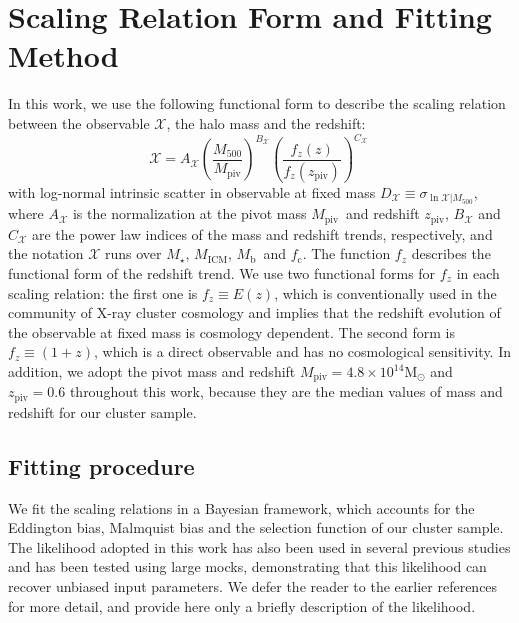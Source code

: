 \documentclass[useAMS,usenatbib,iop,numberedappendix]{mn2e}
\newcommand{\Msun}{\ensuremath{\mathrm{M}_{\odot}}}
\newcommand{\Mfiveoo}{\ensuremath{M_{500}}}
\newcommand{\redshift}{\ensuremath{z}}
\newcommand{\Mstar}{\ensuremath{M_{\star}}}
\newcommand{\Mgas}{\ensuremath{M_{\mathrm{ICM}}}}
\newcommand{\Mbary}{\ensuremath{M_{\mathrm{b}}}}
\newcommand{\MPIV}{\ensuremath{M_{\mathrm{piv}}}}
\newcommand{\ZPIV}{\ensuremath{z_{\mathrm{piv}}}}
\newcommand{\fcold}{\ensuremath{f_{\mathrm{c}}}}
\begin{document}
%
%



\section{Scaling Relation Form and Fitting Method}
\label{sec:method}

In this work, we use the following functional form to describe the scaling relation between the observable $\mathcal{X}$, the halo mass and the redshift:
%
\begin{equation}
\label{eq:sr_functional_form}
\mathcal{X} = A_{\mathcal{X}}
\left( \frac{\Mfiveoo}{\MPIV} \right)^{B_{\mathcal{X}}}
\left( \frac{f_{\redshift}(\redshift)}{f_{\redshift}(\ZPIV)} \right)^{C_{\mathcal{X}}} \, 
\end{equation}
%
with log-normal intrinsic scatter in observable at fixed mass $D_{\mathcal{X}} \equiv \sigma_{\ln \mathcal{X}|M_{500}}$, where $A_{\mathcal{X}}$ is the normalization at the pivot mass \MPIV\ and redshift \ZPIV, $B_{\mathcal{X}}$ and $C_{\mathcal{X}}$ are the power law indices of the mass and redshift trends, respectively, and the notation $\mathcal{X}$ runs over \Mstar, \Mgas, \Mbary\ and \fcold.
The function $f_{\redshift}$ describes the functional form of the redshift trend. 
We use two functional forms for $f_{\redshift}$ in each scaling relation: the first one is $f_{\redshift} \equiv E(\redshift)$, which is conventionally used in the community of X-ray cluster cosmology and implies that the redshift evolution of the observable at fixed mass is 
cosmology
dependent.  The second form is $f_{\redshift}\equiv(1+\redshift)$, which is a direct observable and has no cosmological sensitivity.
In addition, we adopt the pivot mass and redshift $\MPIV = 4.8\times10^{14}\Msun$ and $\ZPIV = 0.6$ throughout this work, because they are the median values of mass and redshift for our cluster sample.

\subsection{Fitting procedure}
\label{sec:fitting_procedure}

We fit the scaling relations in a Bayesian framework, which accounts for the Eddington bias, Malmquist bias and the selection function of our cluster sample.
The likelihood adopted in this work has also been used in several previous studies \cite[][Bulbul et. al. in preparation]{liu15a, chiu16c} and has been tested using large mocks, demonstrating that this likelihood can recover unbiased input parameters.
We defer the reader to the earlier references for more detail, and provide here only a briefly description of the likelihood.
\end{document}
